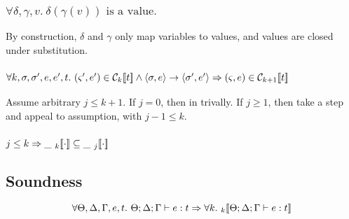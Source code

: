 \subsubsection{$\forall \delta, \gamma, v.\ \delta(\gamma(v))\textrm{ is a value.}$}\label{valueSub}

By construction, $\delta$ and $\gamma$ only map variables to values, and values
are closed under substitution.

\subsubsection{$
    \forall k, \sigma, \sigma', e, e', t.  \ (\varsigma', e') \in \mathcal{C}_{k} [\![ t ]\!] \wedge
    \langle \sigma, e \rangle \rightarrow \langle \sigma', e' \rangle
    \Rightarrow (\varsigma, e) \in \mathcal{C}_{k+1} [\![ t ]\!]
$}\label{stepInC}

Assume arbitrary $j \leq k + 1$. If $j=0$, then in trivally. If $j \geq 1$,
then take a step and appeal to assumption, with $j-1 \leq k$.

\subsubsection{$j \leq k \Rightarrow \mathcal{\_\ }_{k} [\![ \cdot ]\!] \subseteq \mathcal{\_\ }_{j} [\![ \cdot ]\!]$}\label{subsetKJ}

\subsection{Soundness}
\[
    \forall \Theta, \Delta, \Gamma, e, t.\ \Theta; \Delta ; \Gamma \vdash e : t \Rightarrow
    \forall k.\ \den{}{k}{ \Theta; \Delta ; \Gamma \vdash e : t }
\]

